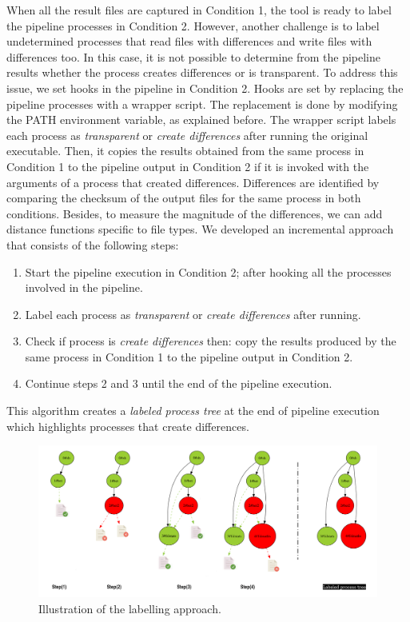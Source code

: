 \documentclass[a4paper,num-refs]{oup-contemporary}
\begin{document}
When all the result files are captured in Condition 1, the tool 
is ready to label the pipeline processes in Condition 2.
However, another challenge is to label undetermined processes that read files with 
differences and write files with differences too. 
In this case, it is not possible to determine from the pipeline results 
whether the process creates differences or 
is transparent.
To address this issue, we set hooks in the pipeline 
in Condition 2. Hooks are set by replacing the pipeline 
processes with a wrapper script.
The replacement is done by modifying the PATH environment variable, as explained before. 
The wrapper script labels each process 
as \emph{transparent} or \emph{create differences} after running 
the original executable. 
Then, it copies the results obtained from the same process in 
Condition 1 to the pipeline output in Condition 2 if 
it is invoked with the arguments of a process that created differences.
Differences are identified by comparing the checksum of the output files for 
the same process in both conditions.
Besides, to measure the magnitude of the differences, we can add distance functions specific to file types.
We developed an incremental approach that consists of the following steps: 

\begin{enumerate}
  \item Start the pipeline execution in Condition 2; 
        after hooking all the processes involved in the pipeline.
  \item Label each process as \emph{transparent} or \emph{create differences} 
        after running.
  \item Check if process is \emph{create differences} then: 
        copy the results produced by the same process in Condition 1 to the 
        pipeline output in Condition 2. 
  \item Continue steps 2 and 3 until the end of the pipeline execution.
\end{enumerate}

This algorithm creates a \emph{labeled process tree} at the end of pipeline execution 
which highlights processes that create differences.

\begin{figure}
  \centering
  \includegraphics[width=\columnwidth]{images/iterative_modif}
  \caption{Illustration of the labelling approach.}
  \label{fig:iterations}
\end{figure}
\end{document}
